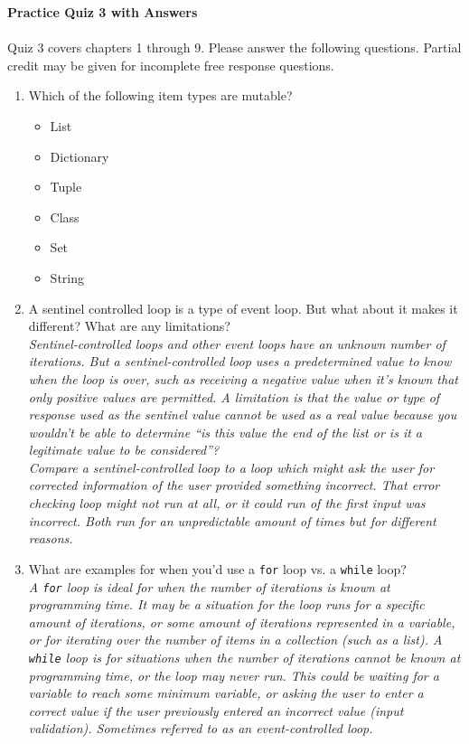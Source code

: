 \documentclass[letter,10pt]{article}
\newcommand*\tick{\item[\Checkmark]}
\newcommand*\fail{\item[\XSolidBrush]}
\begin{document}
\huge
\textbf{Practice Quiz 3 with Answers}
\normalsize

\paragraph{}Quiz 3 covers chapters 1 through 9. Please answer the following questions. Partial credit may be given for incomplete free response questions.

\begin{enumerate}
	\item Which of the following item types are mutable?
    \begin{itemize}
        \tick List
        \tick Dictionary
        \fail Tuple
        \tick Class
        \tick Set
        \fail String
    \end{itemize}

    \item A sentinel controlled loop is a type of event loop. But what about it makes it different? What are any limitations? \\
    \textit{Sentinel-controlled loops and other event loops have an unknown number of iterations. But a sentinel-controlled loop uses a predetermined  value to know when the loop is over, such as receiving a negative value when it's known that only positive values are permitted. A limitation is that the value or type of response used as the sentinel value cannot be used as a real value because you wouldn't be able to determine ``is this value the end of the list or is it a legitimate value to be considered''?} \\
    \textit{Compare a sentinel-controlled loop to a loop which might ask the user for corrected information of the user provided something incorrect. That error checking loop might not run at all, or it could run of the first input was incorrect. Both run for an unpredictable amount of times but for different reasons.}

    \item What are examples for when you'd use a \texttt{for} loop vs. a \texttt{while} loop? \\ \textit{A \texttt{for} loop is ideal for when the number of iterations is known at programming time. It may be a situation for the loop runs for a specific amount of iterations, or some amount of iterations represented in a variable, or for iterating over the number of items in a collection (such as a list). A \texttt{while} loop is for situations when the number of iterations cannot be known at programming time, or the loop may never run. This could be waiting for a variable to reach some minimum variable, or asking the user to enter a correct value if the user previously entered an incorrect value (input validation). Sometimes referred to as an event-controlled loop.}


\end{enumerate}
\end{document}
